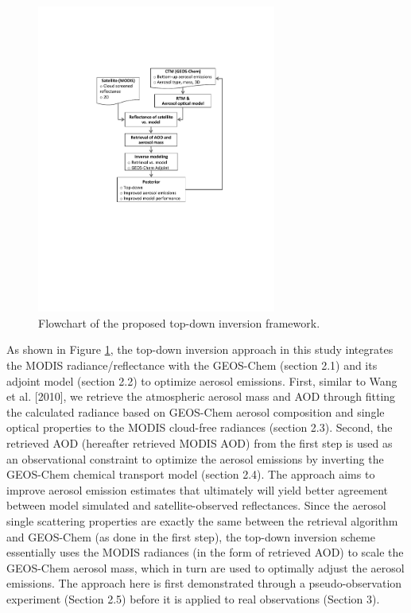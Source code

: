  \begin{figure}[h]
  \centering
  \includegraphics[width={0.7\textwidth}]{figures/a1.pdf}
  \caption{Flowchart of the proposed top-down inversion framework.}
  \label{fig:flowchat}
 \end{figure}

 As shown in Figure \ref{fig:flowchat}, the top-down inversion approach in this study 
 integrates the MODIS radiance/reflectance with the GEOS-Chem (section 2.1) 
 and its adjoint model (section 2.2) to optimize aerosol emissions. 
 First, similar to Wang et al. [2010], we retrieve the atmospheric 
 aerosol mass and AOD through fitting the calculated radiance based on 
 GEOS-Chem aerosol composition and single optical properties to the MODIS 
 cloud-free radiances (section 2.3). Second, the retrieved AOD 
 (hereafter retrieved MODIS AOD) from the first step is used as 
 an observational constraint to optimize the aerosol emissions 
 by inverting the GEOS-Chem chemical transport model (section 2.4). 
 The approach aims to improve aerosol emission estimates that ultimately 
 will yield better agreement between model simulated and satellite-observed 
 reflectances.  Since the aerosol single scattering properties are 
 exactly the same between the retrieval algorithm and GEOS-Chem 
 (as done in the first step), the top-down inversion scheme essentially 
 uses the MODIS radiances (in the form of retrieved AOD) to scale the 
 GEOS-Chem aerosol mass, which in turn are used to optimally adjust 
 the aerosol emissions. The approach here is first demonstrated through 
 a pseudo-observation experiment (Section 2.5) before it is applied 
 to real observations (Section 3).

